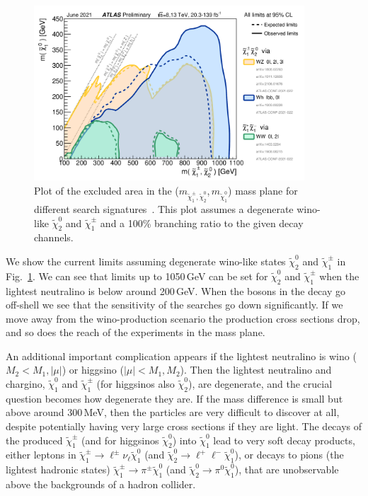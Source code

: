 \documentclass[notes.tex]{subfiles}
\begin{document}
\begin{figure}[t!]
\begin{center}
\includegraphics[width=0.9\textwidth]{figures/chargino_neutralino_limit} 
\caption{Plot of the excluded area in the ($m_{\tilde\chi_1^\pm,\tilde\chi_2^0}$,\,$m_{\tilde{\chi}^0_1}$) mass plane for different search signatures~\cite{ATL-PHYS-PUB-2021-019}. This plot assumes a degenerate wino-like  $\tilde{\chi}^0_2$ and $\tilde{\chi}^\pm_1$ and a 100\% branching ratio to the given decay channels.}
\label{fig:charginolimit}
\end{center}
\end{figure}

We show the current limits assuming degenerate wino-like states $\tilde{\chi}^0_2$ and $\tilde{\chi}^\pm_1$ in Fig.~\ref{fig:charginolimit}. We can see that limits up to 1050\,GeV can be set for $\tilde{\chi}^0_2$ and $\tilde{\chi}^\pm_1$ when the lightest neutralino is below around 200\,GeV. When the bosons in the decay go off-shell we see that the sensitivity of the searches go down significantly. If we move away from the wino-production scenario the production cross sections drop, and so does the reach of the experiments in the mass plane.

An additional important complication appears if the lightest neutralino is wino ($M_2<M_1,|\mu|$) or higgsino ($|\mu|<M_1,M_2$). Then the lightest neutralino and chargino, $\tilde{\chi}^0_1$ and  $\tilde{\chi}^\pm_1$ (for higgsinos also $\tilde{\chi}^0_2$), are degenerate, and the crucial question becomes how degenerate they are. If the mass difference is small but above around 300\,MeV, then the particles are very difficult to discover at all, despite potentially having very large cross sections if they are light. The decays of the produced $\tilde{\chi}^\pm_1$ (and for higgsinos $\tilde{\chi}^0_2$) into $\tilde{\chi}^0_1$ lead to very soft decay products, either leptons in $\tilde{\chi}^\pm_1\to \ell^\pm\nu_\ell\tilde{\chi}^0_1$ (and $\tilde\chi^0_2\to \ell^+\ell^-\tilde{\chi}^0_1$), or decays to pions (the lightest hadronic states) $\tilde{\chi}^\pm_1\to \pi^\pm\tilde{\chi}^0_1$ (and $\tilde\chi^0_2\to \pi^0\tilde{\chi}^0_1$), that are unobservable above the backgrounds of a hadron collider. 
\end{document}
